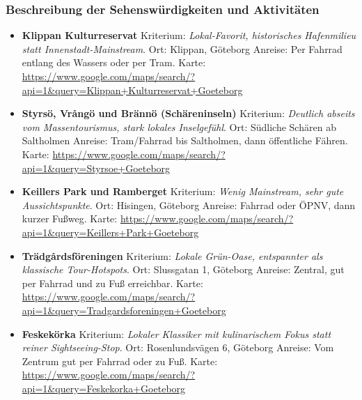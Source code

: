 \documentclass[a4paper,12pt]{article}
\begin{document}
\subsubsection{Beschreibung der Sehenswürdigkeiten und Aktivitäten}
\begin{itemize}
\item \textbf{Klippan Kulturreservat}\newline
Kriterium: \textit{Lokal-Favorit, historisches Hafenmilieu statt Innenstadt-Mainstream}.\newline
Ort: Klippan, Göteborg\newline
Anreise: Per Fahrrad entlang des Wassers oder per Tram.\newline
Karte: \url{https://www.google.com/maps/search/?api=1&query=Klippan+Kulturreservat+Goeteborg}

\item \textbf{Styrsö, Vrångö und Brännö (Schäreninseln)}\newline
Kriterium: \textit{Deutlich abseits vom Massentourismus, stark lokales Inselgefühl}.\newline
Ort: Südliche Schären ab Saltholmen\newline
Anreise: Tram/Fahrrad bis Saltholmen, dann öffentliche Fähren.\newline
Karte: \url{https://www.google.com/maps/search/?api=1&query=Styrsoe+Goeteborg}

\item \textbf{Keillers Park und Ramberget}\newline
Kriterium: \textit{Wenig Mainstream, sehr gute Aussichtspunkte}.\newline
Ort: Hisingen, Göteborg\newline
Anreise: Fahrrad oder ÖPNV, dann kurzer Fußweg.\newline
Karte: \url{https://www.google.com/maps/search/?api=1&query=Keillers+Park+Goeteborg}

\item \textbf{Trädgårdsföreningen}\newline
Kriterium: \textit{Lokale Grün-Oase, entspannter als klassische Tour-Hotspots}.\newline
Ort: Slussgatan 1, Göteborg\newline
Anreise: Zentral, gut per Fahrrad und zu Fuß erreichbar.\newline
Karte: \url{https://www.google.com/maps/search/?api=1&query=Tradgardsforeningen+Goeteborg}

\item \textbf{Feskekörka}\newline
Kriterium: \textit{Lokaler Klassiker mit kulinarischem Fokus statt reiner Sightseeing-Stop}.\newline
Ort: Rosenlundsvägen 6, Göteborg\newline
Anreise: Vom Zentrum gut per Fahrrad oder zu Fuß.\newline
Karte: \url{https://www.google.com/maps/search/?api=1&query=Feskekorka+Goeteborg}
\end{itemize}
\end{document}
